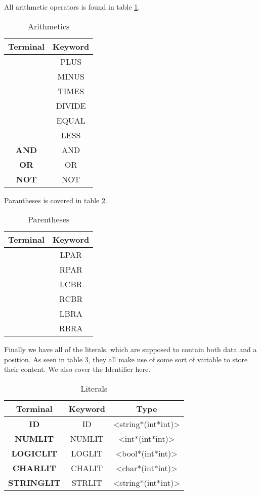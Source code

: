\documentclass[10pt]{article}
\begin{document}
All arithmetic operators is found in table \ref{tab:arithmetics}.

\begin{table}[h!]
\centering
\begin{tabular}{c|c}
Terminal & Keyword \\
\hline
\text{+} & PLUS \\
\text{-} & MINUS \\
\text{*} & TIMES \\
\text{/} & DIVIDE \\
\text{=} & EQUAL \\
\text{<} & LESS \\
\textbf{AND} & AND \\
\textbf{OR} & OR \\
\textbf{NOT} & NOT \\
\end{tabular}
\caption{\label{tab:arithmetics}Arithmetics}
\end{table}

Parantheses is covered in table \ref{tab:parentheses}. %

\begin{table}[h!]
\centering
\begin{tabular}{c|c}
Terminal & Keyword \\
\hline
\text{(} & LPAR \\
\text{)} & RPAR \\
\text{\{} & LCBR \\
\text{\}} & RCBR \\
\text{[} & LBRA \\
\text{]} & RBRA \\
\end{tabular}
\caption{\label{tab:parentheses}Parentheses}
\end{table}

Finally we have all of the literals, which are supposed to contain both data and a position. As seen in table \ref{tab:literals}, they all make use of some sort of variable to store their content. We also cover the Identifier here.

\begin{table}[!h]
\centering
\begin{tabular}{c|cc}
Terminal & Keyword & Type\\
\hline
\textbf{ID} & ID & <string*(int*int)>\\
\textbf{NUMLIT} & NUMLIT & <int*(int*int)>\\
\textbf{LOGICLIT} & LOGLIT & <bool*(int*int)> \\
\textbf{CHARLIT} & CHALIT & <char*(int*int)> \\
\textbf{STRINGLIT} & STRLIT & <string*(int*int)> \\
\end{tabular}
\caption{\label{tab:literals}Literals}
\end{table}
\end{document}
